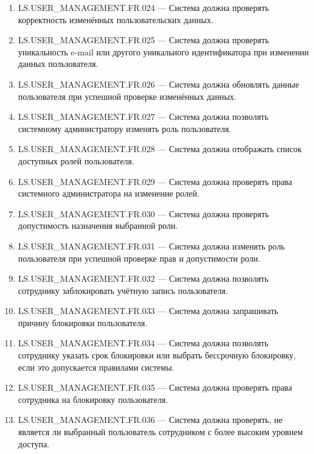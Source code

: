\documentclass[12pt,a4paper]{article}
\begin{document}
\begin{enumerate}
		\item LS.USER\_MANAGEMENT.FR.024 --- Система должна проверять корректность
		изменённых пользовательских данных.
		
		\item LS.USER\_MANAGEMENT.FR.025 --- Система должна проверять уникальность
		e-mail или другого уникального идентификатора при изменении данных
		пользователя.
		
		\item LS.USER\_MANAGEMENT.FR.026 --- Система должна обновлять данные
		пользователя при успешной проверке изменённых данных.
		
		\item LS.USER\_MANAGEMENT.FR.027 --- Система должна позволять системному
		администратору изменять роль пользователя.
		
		\item LS.USER\_MANAGEMENT.FR.028 --- Система должна отображать список
		доступных ролей пользователя.
		
		\item LS.USER\_MANAGEMENT.FR.029 --- Система должна проверять права
		системного администратора на изменение ролей.
		
		\item LS.USER\_MANAGEMENT.FR.030 --- Система должна проверять допустимость
		назначения выбранной роли.
		
		\item LS.USER\_MANAGEMENT.FR.031 --- Система должна изменять роль пользователя
		при успешной проверке прав и допустимости роли.
		
		\item LS.USER\_MANAGEMENT.FR.032 --- Система должна позволять сотруднику
		заблокировать учётную запись пользователя.
		
		\item LS.USER\_MANAGEMENT.FR.033 --- Система должна запрашивать причину
		блокировки пользователя.
		
		\item LS.USER\_MANAGEMENT.FR.034 --- Система должна позволять сотруднику
		указать срок блокировки или выбрать бессрочную блокировку, если это допускается
		правилами системы.
		
		\item LS.USER\_MANAGEMENT.FR.035 --- Система должна проверять права
		сотрудника на блокировку пользователя.
		
		\item LS.USER\_MANAGEMENT.FR.036 --- Система должна проверять, не является ли
		выбранный пользователь сотрудником с более высоким уровнем доступа.
		

\end{enumerate}
\end{document}
